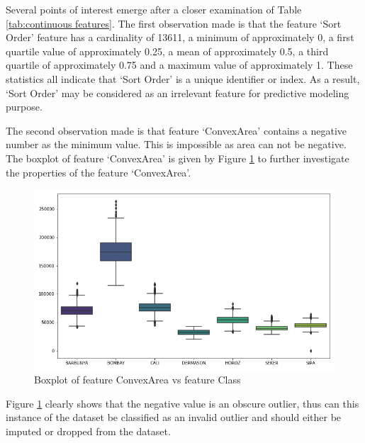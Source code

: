 \documentclass[10pt, conference]{IEEEtran}
\begin{document}
Several points of interest emerge after a closer examination of Table \ref{tab:continuous features}. The first
observation made is that the feature `Sort Order' feature has a cardinality of 13611, a minimum of approximately 0,
a first quartile value of approximately 0.25, a mean of approximately 0.5, a third quartile of approximately 0.75 and
a maximum value of approximately 1. These statistics all indicate that `Sort Order' is a unique identifier or index.
As a result, `Sort Order' may be considered as an irrelevant feature for predictive modeling purpose.

The second observation made is that feature `ConvexArea' contains a negative number as the minimum value. This is
impossible as area can not be negative. The boxplot of feature `ConvexArea' is given by Figure
\ref{ConvexArea_boxplot_negative} to further investigate the properties of the feature `ConvexArea'.
\begin{figure}[h!]
    \centerline{\includegraphics[scale=0.35]{../Plots/Negative ConvexArea boxplot.png}}
    \caption{Boxplot of feature ConvexArea vs feature Class}
    \label{ConvexArea_boxplot_negative}
\end{figure}

Figure \ref{ConvexArea_boxplot_negative} clearly shows that the negative value is an obscure outlier, thus can this
instance of the dataset be classified as an invalid outlier and should either be imputed or dropped from the dataset.
\end{document}

